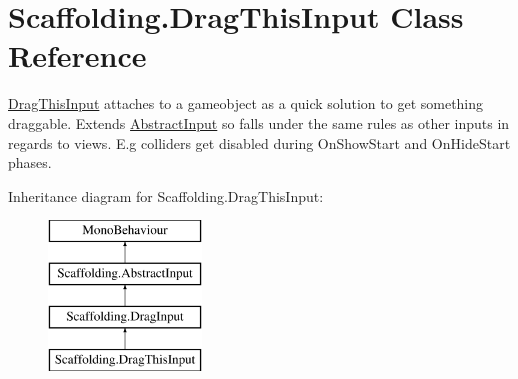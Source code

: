 \hypertarget{class_scaffolding_1_1_drag_this_input}{\section{Scaffolding.\+Drag\+This\+Input Class Reference}
\label{class_scaffolding_1_1_drag_this_input}
}


\hyperlink{class_scaffolding_1_1_drag_this_input}{Drag\+This\+Input} attaches to a gameobject as a quick solution to get something draggable. Extends \hyperlink{class_scaffolding_1_1_abstract_input}{Abstract\+Input} so falls under the same rules as other inputs in regards to views. E.\+g colliders get disabled during On\+Show\+Start and On\+Hide\+Start phases.  


Inheritance diagram for Scaffolding.\+Drag\+This\+Input\+:\begin{figure}[H]
\begin{center}
\leavevmode
\includegraphics[height=4.000000cm]{class_scaffolding_1_1_drag_this_input}
\end{center}
\end{figure}
